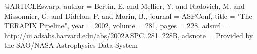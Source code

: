 
@ARTICLE{swarp,
   author = {{Bertin}, E. and {Mellier}, Y. and {Radovich}, M. and {Missonnier}, G. and
    {Didelon}, P. and {Morin}, B.},
  journal = {ASPConf},
    title = "{The TERAPIX Pipeline}",
     year = {2002},
   volume = {281},
    pages = {228},
   adsurl = {http://ui.adsabs.harvard.edu/abs/2002ASPC..281..228B},
  adsnote = {Provided by the SAO/NASA Astrophysics Data System}
}
